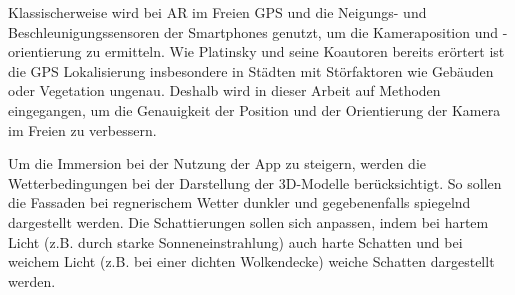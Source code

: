 Klassischerweise wird bei AR im Freien GPS und die Neigungs- und Beschleunigungssensoren der Smartphones genutzt, um die Kameraposition und -orientierung zu ermitteln. Wie Platinsky und seine Koautoren\cite*{platinsky} bereits erörtert ist die GPS Lokalisierung insbesondere in Städten mit Störfaktoren wie Gebäuden oder Vegetation ungenau. Deshalb wird in dieser Arbeit auf Methoden eingegangen, um die Genauigkeit der Position und der Orientierung der Kamera im Freien zu verbessern.

Um die Immersion bei der Nutzung der App zu steigern, werden die Wetterbedingungen bei der Darstellung der 3D-Modelle berücksichtigt. So sollen die Fassaden bei regnerischem Wetter dunkler und gegebenenfalls spiegelnd dargestellt werden. Die Schattierungen sollen sich anpassen, indem bei hartem Licht (z.B. durch starke Sonneneinstrahlung) auch harte Schatten und bei weichem Licht (z.B. bei einer dichten Wolkendecke) weiche Schatten dargestellt werden.